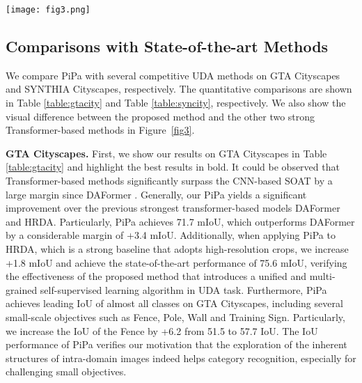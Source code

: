 \documentclass[10pt,twocolumn,letterpaper]{article}
\begin{document}
\begin{figure*}[!t]
  \centering
    \texttt{[image: fig3.png]}
    \vspace{-.1in}
    \caption{Qualitative results on GTA  Cityscapes and SYNTHIA  Cityscapes. From left to right: Target Image, Ground Truth, the visual results predicted by DAFormer, DAFormer + Ours (PiPa), HRDA, HRDA + Ours (PiPa). We deploy the white dash boxes to highlight different prediction parts. }
\label{fig3}
\end{figure*}

\subsection{Comparisons with State-of-the-art Methods}
We compare PiPa with several competitive UDA methods on GTA  Cityscapes and SYNTHIA  Cityscapes, respectively. The quantitative comparisons are shown in Table \ref{table:gtacity} and Table \ref{table:syncity}, respectively. We also show the visual difference between the proposed method and the other two strong Transformer-based methods \cite{hoyer2022daformer, hoyer2022hrda} in Figure~\ref{fig3}. 

\noindent\textbf{GTA  Cityscapes.}  First, we show our results on GTA  Cityscapes in Table \ref{table:gtacity} and highlight the best results in bold. It could be observed that Transformer-based methods significantly surpass the CNN-based SOAT by a large margin since DAFormer \cite{hoyer2022daformer}. Generally, our PiPa yields a significant improvement over the previous strongest transformer-based models DAFormer\cite{hoyer2022daformer} and HRDA\cite{hoyer2022hrda}. Particularly, PiPa achieves 71.7 mIoU, which outperforms DAFormer by a considerable margin of +3.4 mIoU. Additionally, when applying PiPa to HRDA, which is a strong baseline that adopts high-resolution crops, we increase +1.8 mIoU and achieve the state-of-the-art performance of 75.6 mIoU, verifying the effectiveness of the proposed method that introduces a unified and multi-grained self-supervised learning algorithm in UDA task. Furthermore, PiPa achieves leading IoU of almost all classes on GTA  Cityscapes, including several small-scale objectives such as Fence, Pole, Wall and Training Sign. Particularly, we increase the IoU of the Fence by +6.2 from 51.5 to 57.7 IoU. The IoU performance of PiPa verifies our motivation that the exploration of the inherent structures of intra-domain images indeed helps category recognition, especially for challenging small objectives.
\end{document}

